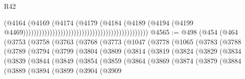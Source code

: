 \begin{lexlean}{R42}
\begin{coremodule}
                                                                                  (@4164
                                                                                    (@4169
                                                                                      (@4174
                                                                                        (@4179
                                                                                          (@4184
                                                                                            (@4189
                                                                                              (@4194
                                                                                                (@4199
                                                                                                  @4469)))))))))))))))))))))))))))))))))))))))))))))))
@4565 := @498
    (@454
      (@464
        (@3753
          (@3758
            (@3763
              (@3768
                (@3773
                  (@1047
                    (@3778
                      (@1065
                        (@3783
                          (@3788
                            (@3789
                              (@3794
                                (@3799
                                  (@3804
                                    (@3809
                                      (@3814
                                        (@3819
                                          (@3824
                                            (@3829
                                              (@3834
                                                (@3839
                                                  (@3844
                                                    (@3849
                                                      (@3854
                                                        (@3859
                                                          (@3864
                                                            (@3869
                                                              (@3874
                                                                (@3879
                                                                  (@3884
                                                                    (@3889
                                                                      (@3894
                                                                        (@3899
                                                                          (@3904
                                                                            (@3909

\end{coremodule}
\end{lexlean}
